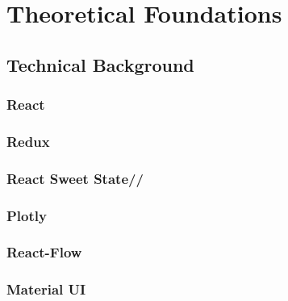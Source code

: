 
\chapter{Theoretical Foundations}\label{chapter:theoreticalFoundacions}

\section{Technical Background}
\subsection{React}
\subsection{Redux}
\subsection{React Sweet State//}
\subsection{Plotly}
\subsection{React-Flow}
\subsection{Material UI}


